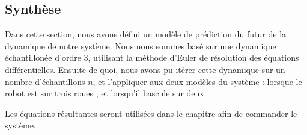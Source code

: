 		\subsection{Synthèse}
		
			Dans cette section, nous avons défini un modèle de prédiction du futur de la dynamique de notre système. 
			Nous nous sommes basé sur une dynamique échantillonée d'ordre 3, utilisant la méthode d'Euler de résolution des équations différentielles.
			Ensuite de quoi, nous avons pu itérer cette dynamique sur un nombre d'échantillons $n$, et l'appliquer aux deux modèles du système : lorsque le robot est sur trois roues , et lorsqu'il bascule sur deux .  
			
			Les équations résultantes  seront utilisées dans le chapitre  afin de commander le système.